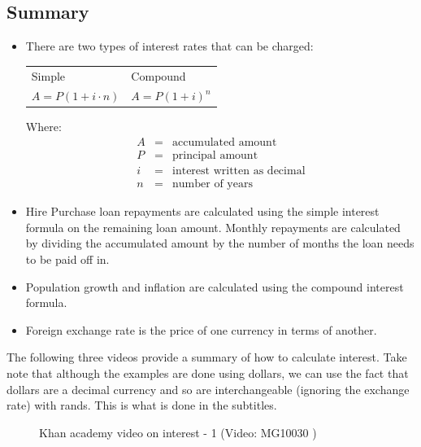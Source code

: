 \subsection{Summary}

\begin{itemize}
    \item There are two types of interest rates that can be charged:\\
    
    \begin{tabularx}{\textwidth}{ XX }
	Simple	&	Compound\\
	$A = P (1 + i \cdot n)$	&	$A = P(1 + i)^n$\\
    \end{tabularx}
    \par
    Where:
    \begin{eqnarray*}
	A &=& \text{accumulated amount}\\
	P &=& \text{principal amount}\\
	i &=& \text{interest written as decimal}\\
	n &=& \text{number of years}
    \end{eqnarray*}

    \item Hire Purchase loan repayments are calculated using the simple interest formula on the remaining loan amount. Monthly repayments are calculated by dividing the accumulated amount by the number of months the loan needs to be paid off in.

    \item Population growth and inflation are calculated using the compound interest formula.

    \item Foreign exchange rate is the price of one currency in terms of another.
\end{itemize}


The following three videos provide a summary of how to calculate interest. Take note that although the examples are done using dollars, we can use the fact that dollars are a decimal currency and so are interchangeable (ignoring the exchange rate) with rands. This is what is done in the subtitles.\par 

\begin{figure}[H]
    \textnormal{Khan academy video on interest - 1}
    \vspace{.1in}
    \nopagebreak
     { (Video:  MG10030 )}
 \end{figure}

